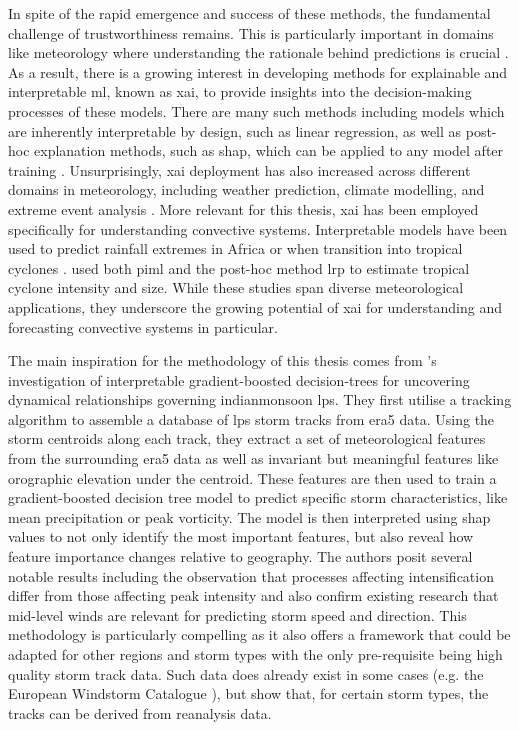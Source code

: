 In spite of the rapid emergence and success of these methods, the fundamental challenge of trustworthiness remains. This is particularly important in domains like meteorology where understanding the rationale behind predictions is crucial \citep{BarredoArrieta2019,Zhang2025}. As a result, there is a growing interest in developing methods for explainable and interpretable \acrshort{ml}, known as \acrfull{xai}, to provide insights into the decision-making processes of these models. There are many such methods including models which are inherently interpretable by design, such as linear regression, as well as post-hoc explanation methods, such as \acrfull{shap}, which can be applied to any model after training \citep{BarredoArrieta2019,Molnar2025}. Unsurprisingly, \acrshort{xai} deployment has also increased across different domains in meteorology, including weather prediction, climate modelling, and extreme event analysis \citep{Mamalakis2022,Yang2024}. More relevant for this thesis, \acrshort{xai} has been employed specifically for understanding convective systems. Interpretable models have been used to predict rainfall extremes in Africa or when  transition into tropical cyclones \citep{Bassine2025,Zhang2019}. \cite{Zhuo2021} used both \acrshort{piml} and the post-hoc method \acrfull{lrp} to estimate tropical cyclone intensity and size. While these studies span diverse meteorological applications, they underscore the growing potential of \acrshort{xai} for understanding and forecasting convective systems in particular.

The main inspiration for the methodology of this thesis comes from \cite{Hunt2024}'s investigation of interpretable gradient-boosted decision-trees for uncovering dynamical relationships governing \gls{indianmonsoon} \acrfull{lps}. They first utilise a tracking algorithm to assemble a database of \acrshort{lps} storm tracks from \acrshort{era5} data. Using the storm centroids along each track, they extract a set of meteorological features from the surrounding \acrshort{era5} data as well as invariant but meaningful features like orographic elevation under the centroid. These features are then used to train a gradient-boosted decision tree model to predict specific storm characteristics, like mean precipitation or peak vorticity. The model is then interpreted using \acrshort{shap} values to not only identify the most important features, but also reveal how feature importance changes relative to geography. The authors posit several notable results including the observation that processes affecting intensification differ from those affecting peak intensity and also confirm existing research that mid-level winds are relevant for predicting storm speed and direction. This methodology is particularly compelling as it also offers a framework that could be adapted for other regions and storm types with the only pre-requisite being high quality storm track data. Such data does already exist in some cases (e.g. the European Windstorm Catalogue \citep{Roberts2014}), but \cite{Hunt2024} show that, for certain storm types, the tracks can be derived from reanalysis data.

